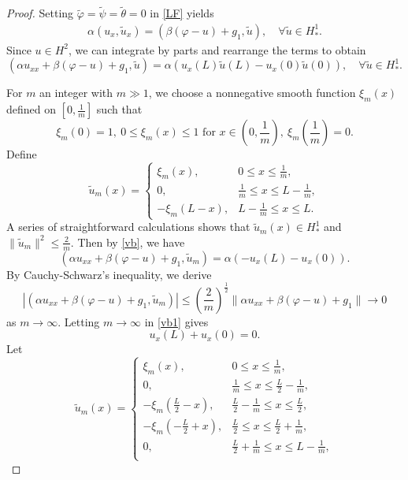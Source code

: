 \documentclass[10pt,a4paper]{amsart}
\newcommand{\dt}{\tilde}
\begin{document}
\begin{proof}
	Setting $\dt \varphi = \dt \psi = \dt \theta = 0$ in \eqref{LF} yields
	\begin{align*}
		\alpha(u_x,\dt u_x) = (\beta(\varphi - u) + g_1, \dt u), \quad \forall \dt u \in H_*^1.
	\end{align*}
	Since $u\in H^2$, we can integrate by parts and rearrange the terms to obtain
	\begin{equation}\label{vb}
		(\alpha u_{xx}+\beta(\varphi - u) + g_1,\dt u)=\alpha \left(u_x(L)\dt u(L)-u_x(0)\dt u(0)\right), \quad \forall \dt u \in H_*^1.
	\end{equation}
	
	For $m$ an integer with $m\gg1$, we choose a nonnegative smooth function $\xi_m(x)$ defined on $\left[0,\frac{1}{m}\right]$ such that
	\[
	\xi_m(0)=1, \ 0\le\xi_m(x)\le 1 \text{ for } x\in\left(0,\frac{1}{m}\right), \ \xi_m\left(\frac{1}{m}\right)=0.
	\]
	Define
	\[
	\tilde{u}_m(x)=
	\begin{cases}
		\xi_m(x), & 0\le x\le\frac{1}{m},\\
		0, & \frac{1}{m}\le x\le L-\frac{1}{m},\\
		-\xi_m(L-x), & L-\frac{1}{m}\le x\le L.
	\end{cases}
	\]
	A series of straightforward calculations shows that $\tilde{u}_m(x)\in H_*^1$ and $\|\tilde{u}_m\|^2 \leq \frac{2}{m}$. Then by \eqref{vb}, we have
	\begin{equation}\label{vb1}
		(\alpha u_{xx}+\beta(\varphi - u) + g_1,\tilde{u}_m)=\alpha \left(-u_x(L)-u_x(0)\right).
	\end{equation}
	By Cauchy-Schwarz's inequality, we derive
	\[
	\left| (\alpha u_{xx}+\beta(\varphi - u) + g_1,\tilde{u}_m)\right|\le\left(\frac{2}{m}\right)^{\frac{1}{2}}\|\alpha u_{xx}+\beta(\varphi - u) + g_1\|\to0
	\]
	as $m\to\infty$.
	 Letting $m\to\infty$ in \eqref{vb1} gives
	\begin{equation}\label{vb2}
		u_x(L)+u_x(0)=0.
	\end{equation}
	Let
	\[
	\tilde{u}_m(x)=
	\begin{cases}
		\xi_m(x), & 0\le x\le \frac{1}{m},\\
		0, & \frac{1}{m}\le x\le\frac{L}{2}-\frac{1}{m},\\
		-\xi_m(\frac{L}{2}-x), &
		\frac{L}{2}-\frac{1}{m}\le x\le\frac{L}{2},\\
		-\xi_m(-\frac{L}{2}+x), &
		\frac{L}{2}\le x\le\frac{L}{2}+\frac{1}{m},\\
		0, &
		\frac{L}{2}+\frac{1}{m}\le x\le L-\frac{1}{m},\\

\end{cases}\]
\end{proof}
\end{document}
